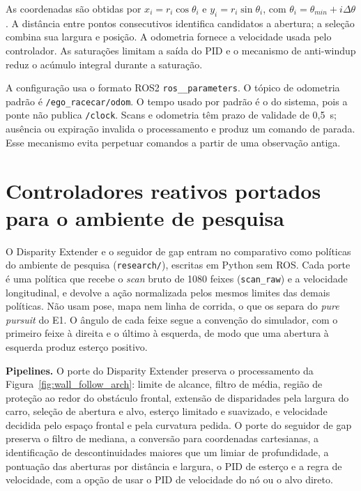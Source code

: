 As coordenadas são obtidas por $x_i=r_i\cos\theta_i$ e
$y_i=r_i\sin\theta_i$, com $\theta_i=\theta_{min}+i\Delta\theta$.
A distância entre pontos consecutivos identifica candidatos a abertura; a
seleção combina sua largura e posição. A odometria fornece a velocidade usada
pelo controlador. As saturações limitam a saída do PID e o mecanismo de
anti-windup reduz o acúmulo integral durante a saturação.

A configuração usa o formato ROS2 \texttt{ros\_\_parameters}. O tópico de
odometria padrão é \texttt{/ego\_racecar/odom}. O tempo usado por padrão é o
do sistema, pois a ponte não publica \texttt{/clock}. Scans e odometria têm
prazo de validade de 0,5~s; ausência ou expiração invalida o processamento e
produz um comando de parada. Esse mecanismo evita perpetuar comandos a partir
de uma observação antiga.

\section{Controladores reativos portados para o ambiente de pesquisa}\label{sec:prop-portes}

O Disparity Extender e o seguidor de gap entram no comparativo como políticas do
ambiente de pesquisa (\texttt{research/}), escritas em Python sem ROS. Cada porte
é uma política que recebe o \textit{scan} bruto de 1080 feixes (\texttt{scan\_raw})
e a velocidade longitudinal, e devolve a ação normalizada pelos mesmos limites das
demais políticas. Não usam pose, mapa nem linha de corrida, o que os separa do
\textit{pure pursuit} do E1. O ângulo de cada feixe segue a convenção do
simulador, com o primeiro feixe à direita e o último à esquerda, de modo que uma
abertura à esquerda produz esterço positivo.

\textbf{Pipelines.} O porte do Disparity Extender preserva o processamento da
Figura~\ref{fig:wall_follow_arch}: limite de alcance, filtro de média, região de
proteção ao redor do obstáculo frontal, extensão de disparidades pela largura do
carro, seleção de abertura e alvo, esterço limitado e suavizado, e velocidade
decidida pelo espaço frontal e pela curvatura pedida. O porte do seguidor de gap
preserva o filtro de mediana, a conversão para coordenadas cartesianas, a
identificação de descontinuidades maiores que um limiar de profundidade, a
pontuação das aberturas por distância e largura, o PID de esterço e a regra de
velocidade, com a opção de usar o PID de velocidade do nó ou o alvo direto.

